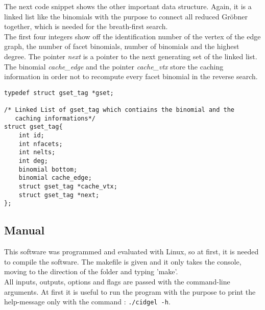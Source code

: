 The next code snippet shows the other important data structure. Again, it is a linked list like the binomials with the purpose to connect all reduced Gröbner together, which is needed for the breath-first search.\\

The first four integers show off the identification number of the vertex of the edge graph, the number of facet binomials, number of binomials and the highest degree. The pointer \emph{next} is a pointer to the next generating set of the linked list. The binomial \emph{cache\_edge} and the pointer \emph{cache\_vtx} store the caching information in order not to recompute every facet binomial in the reverse search. 

\begin{lstlisting} 
typedef struct gset_tag *gset;

/* Linked List of gset_tag which contiains the binomial and the
   caching informations*/
struct gset_tag{
    int id;
    int nfacets;
    int nelts;
    int deg;
    binomial bottom;
    binomial cache_edge;
    struct gset_tag *cache_vtx;
    struct gset_tag *next;
};

\end{lstlisting}

 
 


\subsection{Manual}
\label{subsec:manual}
This software was programmed and evaluated with Linux, so at first, it is needed to compile the software. The makefile is given and it only takes the console, moving to the direction of the folder and typing 'make'. \\
All inputs, outputs, options and flags are passed with the command-line arguments. At first it is useful to run the program with the purpose to print the help-message only with the command : 
\texttt{./cidgel -h}.

